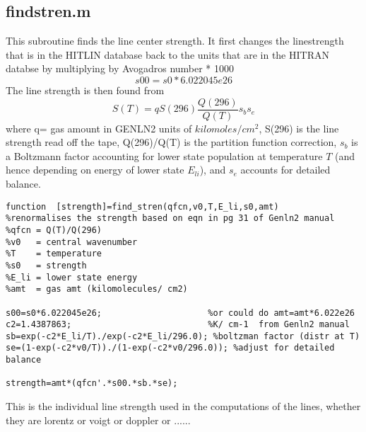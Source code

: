 \documentclass[11pt]{article}
\begin{document}
\subsection{findstren.m}

This subroutine finds the line center strength. It first changes the 
linestrength that is in the HITLIN database back to the units that are
in the HITRAN databse by multiplying by Avogadros number * 1000 
\begin{displaymath}
  s00=s0*6.022045e26
\end{displaymath}
The line strength is then found from 
\begin{displaymath}
S(T) = q S(296) \frac{Q(296)}{Q(T)} s_{b} s_{e}
\end{displaymath}
where q= gas amount in GENLN2 units of $kilomoles/cm^{2}$, S(296) is the 
line strength read off the tape, Q(296)/Q(T) is the partition function 
correction, $s_{b}$ is a Boltzmann factor accounting for lower state 
population at 
temperature $T$ (and hence depending on energy of lower state $E_{li}$), and
$s_{e}$ accounts for detailed balance.

\begin{verbatim}
function  [strength]=find_stren(qfcn,v0,T,E_li,s0,amt)
%renormalises the strength based on eqn in pg 31 of Genln2 manual
%qfcn = Q(T)/Q(296)
%v0   = central wavenumber
%T    = temperature
%s0   = strength
%E_li = lower state energy
%amt  = gas amt (kilomolecules/ cm2)

s00=s0*6.022045e26;                     %or could do amt=amt*6.022e26
c2=1.4387863;                           %K/ cm-1  from Genln2 manual
sb=exp(-c2*E_li/T)./exp(-c2*E_li/296.0); %boltzman factor (distr at T)
se=(1-exp(-c2*v0/T))./(1-exp(-c2*v0/296.0)); %adjust for detailed balance

strength=amt*(qfcn'.*s00.*sb.*se);
\end{verbatim}

This is the individual line strength used in the computations of the lines,
whether they are lorentz or voigt or doppler or ......



\end{document}
